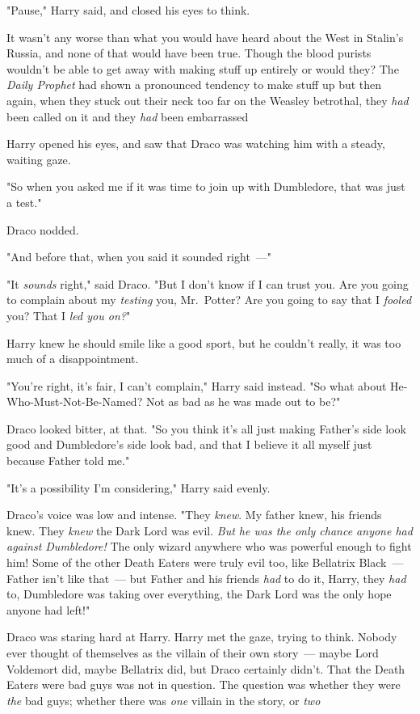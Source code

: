 "Pause," Harry said, and closed his eyes to think.

It wasn't any worse than what you would have heard about the West in Stalin's
Russia, and none of that would have been true. Though the blood purists
wouldn't be able to get away with making stuff up entirely{\el} or would
they? The \emph{Daily Prophet} had shown a pronounced tendency to make stuff
up{\el} but then again, when they stuck out their neck too far on the
Weasley betrothal, they \emph{had} been called on it and they \emph{had} been
embarrassed{\el}

Harry opened his eyes, and saw that Draco was watching him with a steady,
waiting gaze.

"So when you asked me if it was time to join up with Dumbledore, that was just
a test."

Draco nodded.

"And before that, when you said it sounded right~---"

"It \emph{sounds} right," said Draco. "But I don't know if I can trust you. Are
you going to complain about my \emph{testing} you, Mr.~Potter? Are you going to
say that I \emph{fooled} you? That I \emph{led you on?}"

Harry knew he should smile like a good sport, but he couldn't really, it was
too much of a disappointment.

"You're right, it's fair, I can't complain," Harry said instead. "So what about
He-Who-Must-Not-Be-Named? Not as bad as he was made out to be?"

Draco looked bitter, at that. "So you think it's all just making Father's side
look good and Dumbledore's side look bad, and that I believe it all myself just
because Father told me."

"It's a possibility I'm considering," Harry said evenly.

Draco's voice was low and intense. "They \emph{knew}. My father knew, his
friends knew. They \emph{knew} the Dark Lord was evil. \emph{But he was the
only chance anyone had against Dumbledore!} The only wizard anywhere who was
powerful enough to fight him! Some of the other Death Eaters were truly evil
too, like Bellatrix Black~--- Father isn't like that~--- but Father and his friends
\emph{had} to do it, Harry, they \emph{had} to, Dumbledore was taking over
everything, the Dark Lord was the only hope anyone had left!"

Draco was staring hard at Harry. Harry met the gaze, trying to think. Nobody
ever thought of themselves as the villain of their own story~--- maybe Lord
Voldemort did, maybe Bellatrix did, but Draco certainly didn't. That the Death
Eaters were bad guys was not in question. The question was whether they were
\emph{the} bad guys; whether there was \emph{one} villain in the story, or
\emph{two{\el}}

